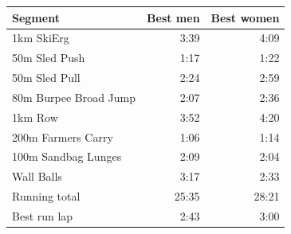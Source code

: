 \begin{tabular}{lrr}
\toprule
\textbf{Segment} & \multicolumn{1}{r}{\textbf{Best men}} & \multicolumn{1}{r}{\textbf{Best women}} \\
\midrule
1km SkiErg & 3:39 & 4:09 \\
50m Sled Push & 1:17 & 1:22 \\
50m Sled Pull & 2:24 & 2:59 \\
80m Burpee Broad Jump & 2:07 & 2:36 \\
1km Row & 3:52 & 4:20 \\
200m Farmers Carry & 1:06 & 1:14 \\
100m Sandbag Lunges & 2:09 & 2:04 \\
Wall Balls & 3:17 & 2:33 \\
Running total & 25:35 & 28:21 \\
Best run lap & 2:43 & 3:00 \\
\bottomrule
\end{tabular}